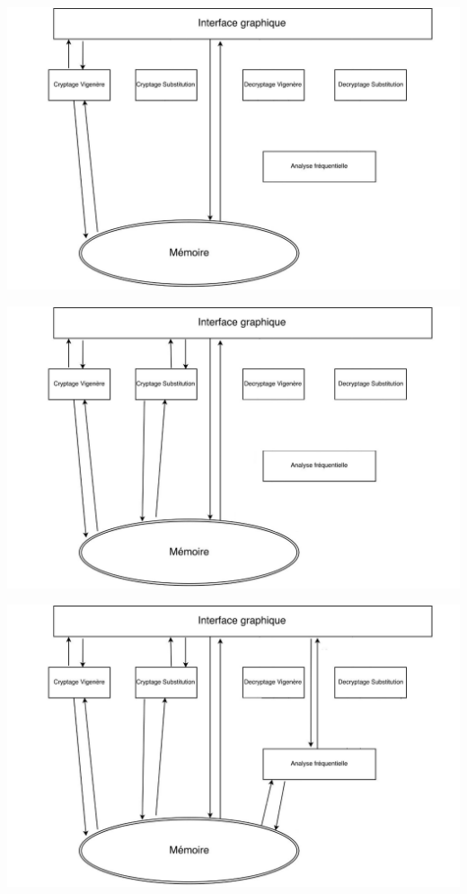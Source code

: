 \documentclass[10pt,xcolor=table]{beamer}
\begin{document}
\begin{frame}
\includegraphics[scale = 0.22]{Org3.jpg}
\end{frame}
\begin{frame}
\includegraphics[scale = 0.22]{Org4.jpg}
\end{frame}
\begin{frame}
\includegraphics[scale = 0.22]{Org5.jpg}
\end{frame}
\end{document}
